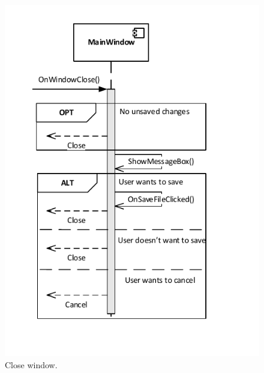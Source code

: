 \begin{figure}[!ht]
	\centering
	\includegraphics{figures/CloseWindow}
	\caption{Close window.}
\end{figure}